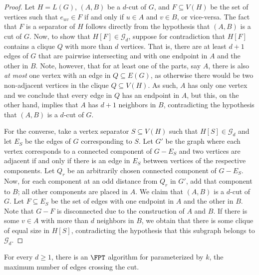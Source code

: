 \begin{proof}
    Let $H = L(G)$, $(A, B)$ be a $d$-cut of $G$, and $F \subseteq V(H)$ be the set of vertices such that $e_{uv} \in F$ if and only if $u \in A$ and $v \in B$, or vice-versa.
    The fact that $F$ is a separator of $H$ follows directly from the hypothesis that $(A, B)$ is a cut of $G$.
    Now, to show that $H[F] \in \mathcal{G}_d$, suppose for contradiction that $H[F]$ contains a  clique $Q$ with more than $d$ vertices.
    That is, there are at least $d+1$ edges of $G$ that are pairwise intersecting and with one endpoint in $A$ and the other in $B$.
    Note, however, that for at least one of the parts, say $A$, there is also {\sl at most} one vertex with an edge in $Q \subseteq E(G)$, as otherwise there would be two non-adjacent vertices in the clique $Q \subseteq V(H)$.
    As such, $A$ has only one vertex and we conclude that every edge in $Q$ has an endpoint in $A$, but this, on the other hand, implies that $A$ has $d+1$ neighbors in $B$, contradicting the hypothesis that $(A, B)$ is a $d$-cut of $G$.


    For the converse, take a vertex separator $S \subseteq V(H)$ such that $H[S] \in \mathcal{G}_d$ and let $E_S$ be the edges of $G$ corresponding to $S$.
    Let $G'$ be the graph where each vertex corresponds to a connected component of $G - E_S$ and two vertices are adjacent if and only if there is an edge in $E_S$ between vertices of the respective components.
    Let $Q_r$ be an arbitrarily chosen connected component of $G - E_S$.
    Now, for each component at an odd distance from $Q_r$ in $G'$, add that component to $B$; all other components are placed in $A$.
    We claim that $(A, B)$ is a $d$-cut of $G$. Let $F \subseteq E_S$ be the set of edges with one endpoint in $A$ and the other in $B$.
    Note that $G - F$ is disconnected due to the construction of $A$ and $B$.
    If there is some $v \in A$ with more than $d$ neighbors in $B$, we obtain that there is some clique of equal size in $H[S]$, contradicting the hypothesis that this subgraph belongs to $\mathcal{G}_d$.
\end{proof}




\begin{theorem}\label{thm:FPT-crossing}
    For every $d \geq 1$, there is an $\FPT$ algorithm for  parameterized by $k$, the maximum number of edges crossing the cut.
\end{theorem}

